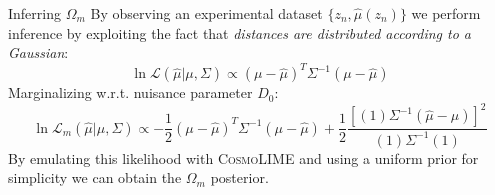 \documentclass[aspectratio=43,xcolor=svgnames]{beamer} %
\begin{document}
\begin{frame}{Inferring $\Omega_m$}
By observing an experimental dataset $\{z_n, \hat{\mu}(z_n)\}$ we perform inference by exploiting the fact that \emph{distances are distributed according to a Gaussian}:
\begin{equation*}
    \ln\mathcal{L}(\hat{\mu}|\mu, \Sigma) \propto (\mu-\hat{\mu})^T\Sigma^{-1}(\mu-\hat{\mu})
\end{equation*}
\pause
Marginalizing w.r.t. nuisance parameter $D_0$:
\begin{equation*}
    \ln\mathcal{L}_m(\hat{\mu}|\mu, \Sigma) \propto -\frac{1}{2}(\mu-\hat{\mu})^T\Sigma^{-1}(\mu-\hat{\mu})+\frac{1}{2}\frac{\left[(1)\Sigma^{-1}(\hat{\mu}-\mu)\right]^2}{(1)\Sigma^{-1}(1)}
\end{equation*}
By emulating this likelihood with \textsc{CosmoLIME} and using a uniform prior for simplicity we can obtain the $\Omega_m$ posterior.
\end{frame}
\end{document}
